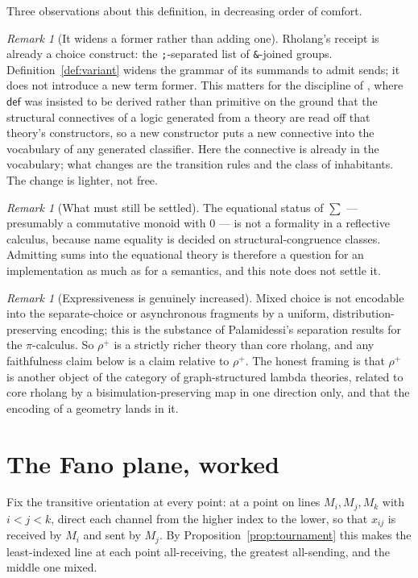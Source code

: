 \documentclass[11pt]{article}
\theoremstyle{plain}
\theoremstyle{definition}
\theoremstyle{remark}
\newtheorem{remark}[theorem]{Remark}
\begin{document}
Three observations about this definition, in decreasing order of comfort.

\begin{remark}[It widens a former rather than adding one]
Rholang's receipt is already a choice construct: the \texttt{;}-separated list of
\texttt{\&}-joined groups. Definition~\ref{def:variant} widens the grammar of its summands
to admit sends; it does not introduce a new term former. This matters for the discipline
of \cite[Remark 1]{KnotsNote}, where $\mathsf{def}$ was insisted to be derived rather than
primitive on the ground that the structural connectives of a logic generated from a theory
are read off that theory's constructors, so a new constructor puts a new connective into
the vocabulary of any generated classifier. Here the connective is already in the
vocabulary; what changes are the transition rules and the class of inhabitants. The change
is lighter, not free.
\end{remark}

\begin{remark}[What must still be settled]
The equational status of $\sum$ --- presumably a commutative monoid with $0$ --- is not
a formality in a reflective calculus, because name equality is decided on
structural-congruence classes. Admitting sums into the equational theory is therefore a
question for an implementation as much as for a semantics, and this note does not settle
it.
\end{remark}

\begin{remark}[Expressiveness is genuinely increased]
Mixed choice is not encodable into the separate-choice or asynchronous fragments by a
uniform, distribution-preserving encoding; this is the substance of Palamidessi's
separation results for the $\pi$-calculus. So $\rho^{+}$ is a strictly richer theory than
core rholang, and any faithfulness claim below is a claim relative to $\rho^{+}$. The
honest framing is that $\rho^{+}$ is another object of the category of graph-structured
lambda theories, related to core rholang by a bisimulation-preserving map in one direction
only, and that the encoding of a geometry lands in it.
\end{remark}

\section{The Fano plane, worked}
\label{sec:worked}

Fix the transitive orientation at every point: at a point on lines $M_i, M_j, M_k$ with
$i<j<k$, direct each channel from the higher index to the lower, so that $x_{ij}$ is
received by $M_i$ and sent by $M_j$. By Proposition~\ref{prop:tournament} this makes the
least-indexed line at each point all-receiving, the greatest all-sending, and the middle
one mixed.
\end{document}
